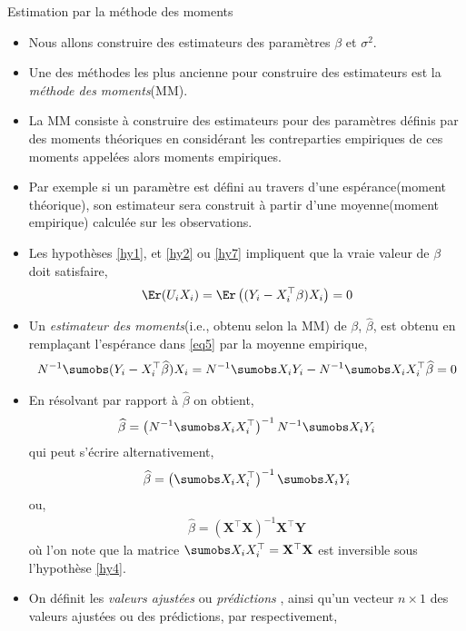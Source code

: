 \begin{frame}[allowframebreaks]{Estimation par la méthode des moments}
\begin{itemize}
\item Nous allons construire des estimateurs des paramètres $\beta$ et $\sigma^2$. 
\item Une des méthodes les plus ancienne pour construire des estimateurs est la \emph{méthode des moments}(MM). \item La MM consiste à construire des estimateurs pour des paramètres définis par des moments théoriques en considérant les contreparties empiriques de ces moments appelées alors moments empiriques. 
\item Par exemple si un paramètre est défini au travers d'une espérance(moment théorique), son  estimateur sera construit à partir d'une moyenne(moment empirique) calculée sur les observations.
\item Les hypothèses \ref{hy1}, et \ref{hy2} ou \ref{hy7} impliquent que la vraie valeur de $\beta$ doit satisfaire,
\begin{align}
\Er(U_iX_i) = \Er\left((Y_i-X_i^\top\beta)X_i\right) = 0
\label{eq5}
\end{align}
 \item Un \emph{estimateur des moments}(i.e., obtenu selon la MM) de $\beta$, $\widehat{\beta}$,  est obtenu en remplaçant l'espérance dans \eqref{eq5} par la moyenne empirique,
\begin{align}
N^{-1}\sumobs(Y_i - X_i^\top\widehat{\beta})X_i = N^{-1}\sumobs X_iY_i - N^{-1}\sumobs X_iX_i^\top\widehat{\beta} = 0
\label{eq6}
\end{align}
\item En résolvant par rapport à $\widehat{\beta}$ on obtient,
\begin{align}
\widehat{\beta} = \left(N^{-1}\sumobs X_iX_i^\top\right)^{-1}N^{-1}\sumobs X_iY_i
\label{eq7}
\end{align}
qui peut s'écrire alternativement,
\begin{align}
\widehat{\beta} = \left(\sumobs X_iX_i^\top\right)^{-1}\sumobs X_iY_i
\label{eq8}
\end{align}
ou,
\begin{align}
\widehat{\beta} = \left(\mathbf{X}^\top\mathbf{X}\right)^{-1}\mathbf{X}^\top\mathbf{Y}
\label{eq9}
\end{align}
où l'on note que la matrice $\sumobs X_iX_i^\top = \mathbf{X}^\top\mathbf{X}$ est inversible sous l'hypothèse \ref{hy4}.
\item On définit les \emph{valeurs ajustées} ou \emph{prédictions} , ainsi qu'un vecteur $n\times 1$ des valeurs ajustées ou des prédictions, par respectivement,

\end{itemize}
\end{frame}
